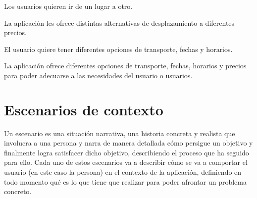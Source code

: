 \vspace{0.5cm}

\begin{problema}

      Los usuarios quieren ir de un lugar a otro.

            {\centering
                  \begin{vision}\justifying\noindent
                        La aplicación les ofrece distintas alternativas de desplazamiento a diferentes precios.
                  \end{vision}}
\end{problema}

\vspace{0.5cm}

\begin{problema}

      El usuario quiere tener diferentes opciones de transporte, fechas y horarios.

            {\centering
                  \begin{vision}\justifying\noindent
                        La aplicación ofrece diferentes opciones de transporte, fechas, horarios y precios para poder adecuarse a las necesidades del usuario o usuarios.
                  \end{vision}}
\end{problema}

\section{Escenarios de contexto}
Un escenario es una situación narrativa, una historia concreta y realista que
involucra a una persona y narra de manera detallada cómo persigue un objetivo y
finalmente logra satisfacer dicho objetivo, describiendo el proceso que ha
seguido para ello. Cada uno de estos escenarios va a describir cómo se va a
comportar el usuario (en este caso la persona) en el contexto de la aplicación,
definiendo en todo momento qué es lo que tiene que realizar para poder afrontar
un problema concreto.
